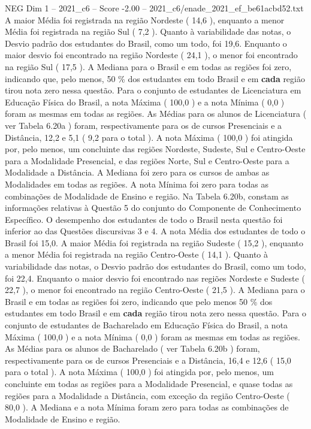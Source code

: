 \begin{textsample}{NEG Dim 1 – 2021\_c6 – Score -2.00 – 2021\_c6/enade\_2021\_ef\_be61acbd52.txt}
A maior Média foi registrada na região Nordeste ( 14,6 ), enquanto a menor Média foi registrada na região Sul ( 7,2 ).
Quanto à variabilidade das notas, o Desvio padrão dos estudantes do Brasil, como um todo, foi 19,6.
Enquanto o maior desvio foi encontrado na região Nordeste ( 24,1 ), o menor foi encontrado na região Sul ( 17,5 ).
A Mediana para o Brasil e em todas as regiões foi zero, indicando que, pelo menos, 50 \% dos estudantes em todo Brasil e em \textbf{cada} região tirou nota zero nessa questão.
Para o conjunto de estudantes de Licenciatura em Educação Física do Brasil, a nota Máxima ( 100,0 ) e a nota Mínima ( 0,0 ) foram as mesmas em todas as regiões.
As Médias para os alunos de Licenciatura ( ver Tabela 6.20a ) foram, respectivamente para os de cursos Presenciais e a Distância, 12,2 e 5,1 ( 9,2 para o total ).
A nota Máxima ( 100,0 ) foi atingida por, pelo menos, um concluinte das regiões Nordeste, Sudeste, Sul e Centro-Oeste para a Modalidade Presencial, e das regiões Norte, Sul e Centro-Oeste para a Modalidade a Distância.
A Mediana foi zero para os cursos de ambas as Modalidades em todas as regiões.
A nota Mínima foi zero para todas as combinações de Modalidade de Ensino e região.
Na Tabela 6.20b, constam as informações relativas à Questão 5 do conjunto do Componente de Conhecimento Específico.
O desempenho dos estudantes de todo o Brasil nesta questão foi inferior ao das Questões discursivas 3 e 4.
A nota Média dos estudantes de todo o Brasil foi 15,0.
A maior Média foi registrada na região Sudeste ( 15,2 ), enquanto a menor Média foi registrada na região Centro-Oeste ( 14,1 ).
Quanto à variabilidade das notas, o Desvio padrão dos estudantes do Brasil, como um todo, foi 22,4.
Enquanto o maior desvio foi encontrado nas regiões Nordeste e Sudeste ( 22,7 ), o menor foi encontrado na região Centro-Oeste ( 21,5 ).
A Mediana para o Brasil e em todas as regiões foi zero, indicando que pelo menos 50 \% dos estudantes em todo Brasil e em \textbf{cada} região tirou nota zero nessa questão.
Para o conjunto de estudantes de Bacharelado em Educação Física do Brasil, a nota Máxima ( 100,0 ) e a nota Mínima ( 0,0 ) foram as mesmas em todas as regiões.
As Médias para os alunos de Bacharelado ( ver Tabela 6.20b ) foram, respectivamente para os de cursos Presenciais e a Distância, 16,4 e 12,6 ( 15,0 para o total ).
A nota Máxima ( 100,0 ) foi atingida por, pelo menos, um concluinte em todas as regiões para a Modalidade Presencial, e quase todas as regiões para a Modalidade a Distância, com exceção da região Centro-Oeste ( 80,0 ).
A Mediana e a nota Mínima foram zero para todas as combinações de Modalidade de Ensino e região.

\end{textsample}
